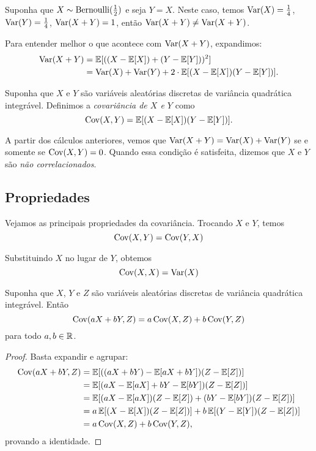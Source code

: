 \begin{example}
Suponha que $ X \sim \mathrm{Bernoulli}(\frac{1}{2}) $ e seja $ Y = X $. Neste caso, temos $ \mathrm{Var}(X) = \frac{1}{4} $, $ \mathrm{Var}(Y) = \frac{1}{4} $, $ \mathrm{Var}(X+Y) = 1 $, então $ \mathrm{Var}(X+Y) \ne \mathrm{Var}(X+Y) $.
\end{example}

Para entender melhor o que acontece com $ \mathrm{Var}(X+Y) $, expandimos:
\begin{align}
\mathrm{Var} (X+Y)
&= \mathbb{E} [ ((X -\mathbb{E} [X])+(Y  -\mathbb{E} [Y]))^2 ] \\
&= \mathrm{Var} (X) +\mathrm{Var} (Y) + 2 \cdot \mathbb{E} [(X-\mathbb{E} [X] )(Y-\mathbb{E} [Y])].
\end{align}

\begin{definition}
[Covariância]
Suponha que $ X $ e $ Y $ são variáveis aleatórias discretas de variância quadrática integrável. Definimos a \emph{covariância de $ X $ e $ Y $} como
\[
\mathrm{Cov}(X,Y)
=
\mathbb{E}[ (X-\mathbb{E}[X])(Y-\mathbb{E}[Y]) ]
.
\]
\end{definition}

A partir dos cálculos anteriores, vemos que $ \mathrm{Var} (X+Y) = \mathrm{Var}(X)+\mathrm{Var}(Y) $ se e somente se $ \mathrm{Cov}(X,Y)=0 $. Quando essa condição é satisfeita, dizemos que $ X $ e $ Y $ são \emph{não correlacionados}.

\subsection{Propriedades}
\label{sub:covproperties}

Vejamos as principais propriedades da covariância.
Trocando $ X $ e $ Y $, temos
\[
\mathrm{Cov}(X,Y)
=
\mathrm{Cov}(Y,X)
\]

Substituindo $ X $ no lugar de $ Y $, obtemos
\[
\mathrm{Cov}(X,X) = \mathrm{Var}(X)
\]

\begin{proposition}
Suponha que $ X $, $ Y $ e $ Z $ são variáveis aleatórias discretas de variância quadrática integrável. Então
\[
\mathrm{Cov}(aX+bY,Z)
=
a\, \mathrm{Cov}(X,Z)
+
b\, 
\mathrm{Cov}(Y,Z)
\]
para todo $ a,b\in\mathbb{R} $.
\end{proposition}
\begin{proof}
Basta expandir e agrupar:
\begin{align}
\mathrm{Cov}(aX+bY,Z)
& =
\mathbb{E}[ ((aX+bY)-\mathbb{E}[aX+bY])(Z-\mathbb{E}[Z]) ]
\\
& =
\mathbb{E}[ (aX-\mathbb{E}[aX]+bY-\mathbb{E}[bY])(Z-\mathbb{E}[Z]) ]
\\
& =
\mathbb{E}[ (aX-\mathbb{E}[aX])(Z-\mathbb{E}[Z])+(bY-\mathbb{E}[bY])(Z-\mathbb{E}[Z]) ]
\\
& =
a\, \mathbb{E}[ (X-\mathbb{E}[X])(Z-\mathbb{E}[Z])]+b\,  \mathbb{E}[(Y-\mathbb{E}[Y])(Z-\mathbb{E}[Z]) ]
\\
& =
a\, \mathrm{Cov}(X,Z)
+
b\, 
\mathrm{Cov}(Y,Z),
\end{align}
provando a identidade.
\end{proof}

